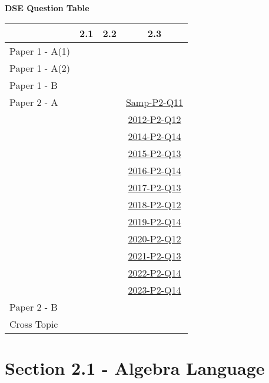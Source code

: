 \documentclass[12pt, a4paper]{article}
\begin{document}
\begin{absolutelynopagebreak}
\begin{center}
\textbf{DSE Question Table}
\end{center}
\begin{center}
\begin{tabular}{|l|c|c|c|}
\hline
        & 2.1 & 2.2 & 2.3 \\\hline
\hline
Paper 1 - A(1)&  &  &  \\
\hline
Paper 1 - A(2)&  &  &  \\
\hline
Paper 1 - B&  &  &  \\
\hline
\hline
Paper 2 - A&  &  & \hyperref[DSE2012S-CoreP2-Q11]{Samp-P2-Q11} \\
&  &  & \hyperref[DSE2012-CoreP2-Q12]{2012-P2-Q12} \\
&  &  & \hyperref[DSE2014-CoreP2-Q14]{2014-P2-Q14} \\
&  &  & \hyperref[DSE2015-CoreP2-Q13]{2015-P2-Q13} \\
&  &  & \hyperref[DSE2016-CoreP2-Q14]{2016-P2-Q14} \\
&  &  & \hyperref[DSE2017-CoreP2-Q13]{2017-P2-Q13} \\
&  &  & \hyperref[DSE2018-CoreP2-Q12]{2018-P2-Q12} \\
&  &  & \hyperref[DSE2019-CoreP2-Q14]{2019-P2-Q14} \\
&  &  & \hyperref[DSE2020-CoreP2-Q12]{2020-P2-Q12} \\
&  &  & \hyperref[DSE2021-CoreP2-Q13]{2021-P2-Q13} \\
&  &  & \hyperref[DSE2022-CoreP2-Q14]{2022-P2-Q14} \\
&  &  & \hyperref[DSE2023-CoreP2-Q14]{2023-P2-Q14} \\
\hline
Paper 2 - B&  &  &  \\
\hline
\hline
Cross Topic&  &  &  \\
\hline
\end{tabular}
\end{center}
\end{absolutelynopagebreak}




\section*{Section 2.1 - Algebra Language}\label{section:1-2-1}





\end{document}
